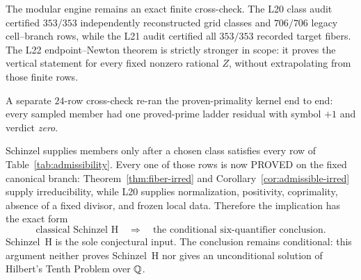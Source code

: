 The modular engine remains an exact finite cross-check.  The L20 class
audit certified $353/353$ independently reconstructed grid classes and
$706/706$ legacy cell--branch rows, while the L21 audit certified all
$353/353$ recorded target fibers.  The L22 endpoint--Newton theorem is
strictly stronger in scope: it proves the vertical statement for every
fixed nonzero rational $Z$, without extrapolating from those finite rows.

A separate $24$-row cross-check re-ran the proven-primality kernel end to
end: every sampled member had one proved-prime ladder residual with symbol
$+1$ and verdict \emph{zero}.

\begin{remark}
Schinzel supplies members only after a chosen class satisfies every row of
Table~\ref{tab:admissibility}.  Every one of those rows is now PROVED on the
fixed canonical branch: Theorem~\ref{thm:fiber-irred} and
Corollary~\ref{cor:admissible-irred} supply irreducibility, while L20
supplies normalization, positivity, coprimality, absence of a fixed
divisor, and frozen local data.  Therefore the implication has the exact
form
\[
 \text{classical Schinzel H}
 \quad\Longrightarrow\quad
 \text{the conditional six-quantifier conclusion}.
\]
Schinzel~H is the sole conjectural input.  The conclusion remains
conditional: this argument neither proves Schinzel~H nor gives an
unconditional solution of Hilbert's Tenth Problem over $\mathbb{Q}$.
\end{remark}
